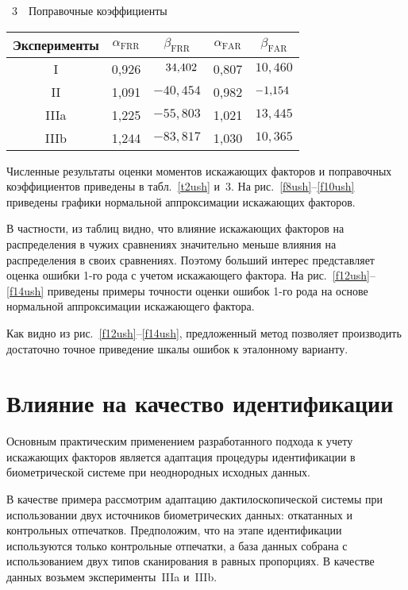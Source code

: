 \begin{multicols}{2}
 {\small \begin{center}
{{\tablename~3}\ \ \small{Поправочные коэффициенты}}

\vspace*{2ex}

\tabcolsep=5.5pt
\begin{tabular}{|c|c|c|c|c|}
\hline
Эксперименты&$\alpha_{\mathrm{FRR}}$ &$\beta_{\mathrm{FRR}}$ &$\alpha_{\mathrm{FAR}}$ &$\beta_{\mathrm{FAR}}$ \\
\hline
I&0,926&$\hphantom{-}34{,}402$&0,807&$10{,}460$\\
II&1,091&$-40{,}454$&0,982&$-1{,}154\hphantom{,}$\\
IIIa&1,225&$-55{,}803$&1,021&$13{,}445$\\
IIIb&1,244&$-83{,}817$&1,030&$10{,}365$\\
\hline
\end{tabular}
\end{center}
}

\bigskip
\addtocounter{table}{1}
    
     Численные результаты оценки моментов искажающих факторов и поправочных 
коэффициентов приведены в табл.~\ref{t2ush} и~3. На 
     рис.~\ref{f8ush}--\ref{f10ush} приведены графики нормальной аппроксимации 
искажающих факторов. 



В частности, из таблиц видно, что влияние ис\-кажающих факторов на 
распределения в чужих сравнениях значительно меньше влияния на распределения в 
своих сравнениях. Поэтому больший интерес представляет оценка ошибки 1-го рода с 
учетом искажающего фактора. На рис.~\ref{f12ush}--\ref{f14ush} приведены примеры 
точности оценки ошибок 1-го рода на основе нормальной аппроксимации ис\-ка\-жа\-юще\-го 
фактора. 

     Как видно из рис.~\ref{f12ush}--\ref{f14ush}, предложенный метод позволяет 
производить достаточно точное приведение шкалы ошибок к эталонному варианту. 
     
     \section{Влияние на качество идентификации}

     Основным практическим применением разработанного подхода к учету 
искажающих факторов является адаптация процедуры идентификации в 
биометрической системе при неоднородных исходных данных. 
     
     В качестве примера рассмотрим адаптацию дактилоскопической системы при 
использовании двух источников биометрических данных: откатанных и контрольных 
отпечатков. Предположим, что на этапе идентификации используются только 
контрольные отпечатки, а база данных собрана с использованием двух типов 
сканирования в равных пропорциях. В качестве данных возьмем эксперименты~IIIa 
и~IIIb. 
\pagebreak

\end{multicols}
     
